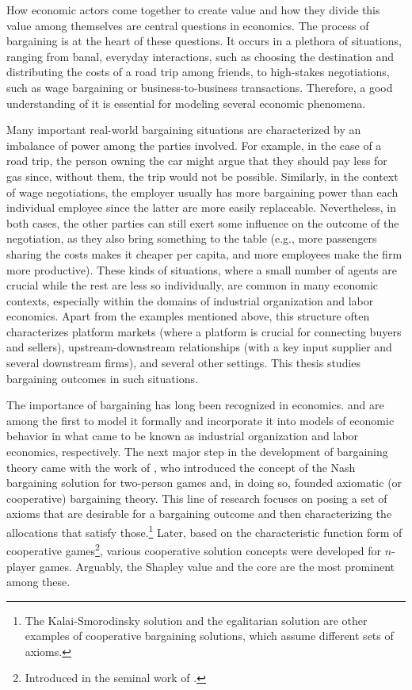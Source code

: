 How economic actors come together to create value and how they divide this value among themselves are central questions in economics.
The process of bargaining is at the heart of these questions.
It occurs in a plethora of situations, ranging from banal, everyday interactions, such as choosing the destination and distributing the costs of a road trip among friends, to high-stakes negotiations, such as wage bargaining or business-to-business transactions.
Therefore, a good understanding of it is essential for modeling several economic phenomena.

Many important real-world bargaining situations are characterized by an imbalance of power among the parties involved.
For example, in the case of a road trip, the person owning the car might argue that they should pay less for gas since, without them, the trip would not be possible.
Similarly, in the context of wage negotiations, the employer usually has more bargaining power than each individual employee since the latter are more easily replaceable.
Nevertheless, in both cases, the other parties can still exert some influence on the outcome of the negotiation, as they also bring something to the table (e.g., more passengers sharing the costs makes it cheaper per capita, and more employees make the firm more productive).
These kinds of situations, where a small number of agents are crucial while the rest are less so individually, are common in many economic contexts, especially within the domains of industrial organization and labor economics.
Apart from the examples mentioned above, this structure often characterizes platform markets (where a platform is crucial for connecting buyers and sellers), upstream-downstream relationships (with a key input supplier and several downstream firms), and several other settings.
This thesis studies bargaining outcomes in such situations.

The importance of bargaining has long been recognized in economics.
\textcite{zeuthen1930problems} and \textcite{hicks1932theory} are among the first to model it formally and incorporate it into models of economic behavior in what came to be known as industrial organization and labor economics, respectively.
The next major step in the development of bargaining theory came with the work of \textcite{nash1950bargaining}, who introduced the concept of the Nash bargaining solution for two-person games and, in doing so, founded axiomatic (or cooperative) bargaining theory.
This line of research focuses on posing a set of axioms that are desirable for a bargaining outcome and then characterizing the allocations that satisfy those.\footnote{
    The Kalai-Smorodinsky solution \parencite{kalai1975other} and the egalitarian solution \parencite{kalai1977proportional} are other examples of cooperative bargaining solutions, which assume different sets of axioms.
}
Later, based on the characteristic function form of cooperative games\footnote{
    Introduced in the seminal work of \textcite{neumann1944theory}.
}, various cooperative solution concepts were developed for $n$-player games.
Arguably, the Shapley value \parencite{shapley1953value} and the core \parencite{gillies1959solutions} are the most prominent among these.

